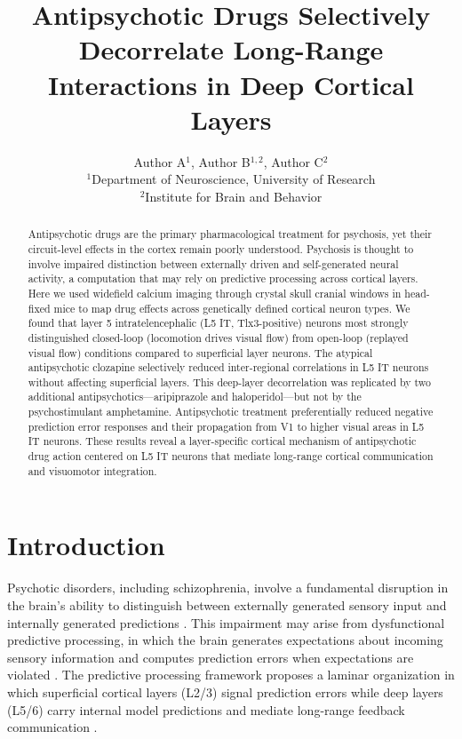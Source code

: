 \documentclass[11pt]{article}
\title{Antipsychotic Drugs Selectively Decorrelate Long-Range Interactions in Deep Cortical Layers}
\author{Author A$^{1}$, Author B$^{1,2}$, Author C$^{2}$ \\
\small $^{1}$Department of Neuroscience, University of Research \\
\small $^{2}$Institute for Brain and Behavior}
\date{}
\begin{document}
\maketitle

\begin{abstract}
Antipsychotic drugs are the primary pharmacological treatment for psychosis, yet their circuit-level effects in the cortex remain poorly understood. Psychosis is thought to involve impaired distinction between externally driven and self-generated neural activity, a computation that may rely on predictive processing across cortical layers. Here we used widefield calcium imaging through crystal skull cranial windows in head-fixed mice to map drug effects across genetically defined cortical neuron types. We found that layer 5 intratelencephalic (L5 IT, Tlx3-positive) neurons most strongly distinguished closed-loop (locomotion drives visual flow) from open-loop (replayed visual flow) conditions compared to superficial layer neurons. The atypical antipsychotic clozapine selectively reduced inter-regional correlations in L5 IT neurons without affecting superficial layers. This deep-layer decorrelation was replicated by two additional antipsychotics---aripiprazole and haloperidol---but not by the psychostimulant amphetamine. Antipsychotic treatment preferentially reduced negative prediction error responses and their propagation from V1 to higher visual areas in L5 IT neurons. These results reveal a layer-specific cortical mechanism of antipsychotic drug action centered on L5 IT neurons that mediate long-range cortical communication and visuomotor integration.
\end{abstract}

\section{Introduction}

Psychotic disorders, including schizophrenia, involve a fundamental disruption in the brain's ability to distinguish between externally generated sensory input and internally generated predictions \citep{friston2005,adams2013}. This impairment may arise from dysfunctional predictive processing, in which the brain generates expectations about incoming sensory information and computes prediction errors when expectations are violated \citep{rao1999,keller2018}. The predictive processing framework proposes a laminar organization in which superficial cortical layers (L2/3) signal prediction errors while deep layers (L5/6) carry internal model predictions and mediate long-range feedback communication \citep{bastos2012}.
\end{document}
